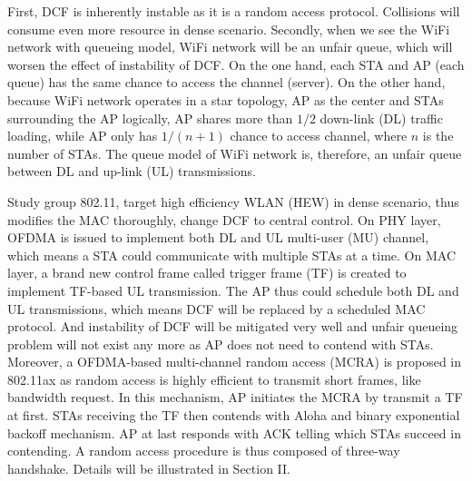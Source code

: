 \documentclass[journal]{IEEEtran}
\begin{document}
First, DCF is inherently instable as it is a random access protocol. 
Collisions will consume even more resource in dense scenario. 
Secondly, when we see the WiFi network with queueing model, WiFi network will be an unfair queue, which will worsen the effect of instability of DCF. 
On the one hand, each STA and AP  (each queue) has the same chance to access the channel (server). 
On the other hand, because WiFi network operates in a star topology, AP as the center and STAs surrounding the AP logically, AP shares more than $1/2$ down-link (DL) traffic loading, while AP only has $1/(n+1)$ chance to access channel, where $n$ is the number of STAs.
The queue model of WiFi network is, therefore, an unfair queue between DL and up-link (UL) transmissions. 


Study group 802.11, target high efficiency WLAN (HEW) in dense scenario, thus modifies the MAC thoroughly, change DCF to central control. 
On PHY layer, OFDMA is issued to implement both DL and UL multi-user (MU) channel, which means a STA could communicate with multiple STAs at a time. 
On MAC layer, a brand new control frame called trigger frame (TF) is created to implement TF-based UL transmission. 
The AP thus could schedule both DL and UL transmissions, which means DCF will be replaced by a scheduled MAC protocol. 
And instability of DCF will be mitigated very well and unfair queueing problem will not exist any more as AP does not need to contend with STAs.
Moreover, a OFDMA-based multi-channel random access (MCRA) is proposed in 802.11ax as random access is highly efficient to transmit short frames, like bandwidth request. 
In this mechanism, AP initiates the MCRA by transmit a TF at first. 
STAs receiving the TF then contends with Aloha and binary exponential backoff mechanism. 
AP at last responds with ACK telling which STAs succeed in contending.
A random access procedure is thus composed of three-way handshake. 
Details will be illustrated in Section II.
\end{document}

